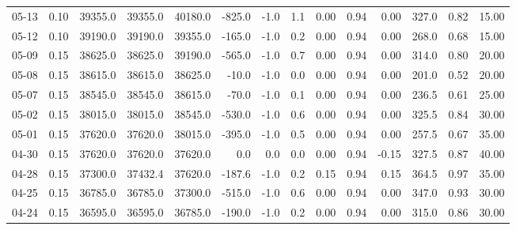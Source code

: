 \begin{threeparttable}
{\begin{tabular}{lrrrrrrrrrrrrr}
  05-13 &     0.10 & 39355.0 & 39355.0 & 40180.0 &     -825.0 &                     -1.0 &                 1.1 &       0.00 &      0.94 &           0.00 &            327.0 &            0.82 &                  15.00 \\
  05-12 &     0.10 & 39190.0 & 39190.0 & 39355.0 &     -165.0 &                     -1.0 &                 0.2 &       0.00 &      0.94 &           0.00 &            268.0 &            0.68 &                  15.00 \\
  05-09 &     0.15 & 38625.0 & 38625.0 & 39190.0 &     -565.0 &                     -1.0 &                 0.7 &       0.00 &      0.94 &           0.00 &            314.0 &            0.80 &                  20.00 \\
  05-08 &     0.15 & 38615.0 & 38615.0 & 38625.0 &      -10.0 &                     -1.0 &                 0.0 &       0.00 &      0.94 &           0.00 &            201.0 &            0.52 &                  20.00 \\
  05-07 &     0.15 & 38545.0 & 38545.0 & 38615.0 &      -70.0 &                     -1.0 &                 0.1 &       0.00 &      0.94 &           0.00 &            236.5 &            0.61 &                  25.00 \\
  05-02 &     0.15 & 38015.0 & 38015.0 & 38545.0 &     -530.0 &                     -1.0 &                 0.6 &       0.00 &      0.94 &           0.00 &            325.5 &            0.84 &                  30.00 \\
  05-01 &     0.15 & 37620.0 & 37620.0 & 38015.0 &     -395.0 &                     -1.0 &                 0.5 &       0.00 &      0.94 &           0.00 &            257.5 &            0.67 &                  35.00 \\
  04-30 &     0.15 & 37620.0 & 37620.0 & 37620.0 &        0.0 &                      0.0 &                 0.0 &       0.00 &      0.94 &          -0.15 &            327.5 &            0.87 &                  40.00 \\
  04-28 &     0.15 & 37300.0 & 37432.4 & 37620.0 &     -187.6 &                     -1.0 &                 0.2 &       0.15 &      0.94 &           0.15 &            364.5 &            0.97 &                  35.00 \\
  04-25 &     0.15 & 36785.0 & 36785.0 & 37300.0 &     -515.0 &                     -1.0 &                 0.6 &       0.00 &      0.94 &           0.00 &            347.0 &            0.93 &                  30.00 \\
  04-24 &     0.15 & 36595.0 & 36595.0 & 36785.0 &     -190.0 &                     -1.0 &                 0.2 &       0.00 &      0.94 &           0.00 &            315.0 &            0.86 &                  30.00 \\

\end{tabular}}
\end{threeparttable}
